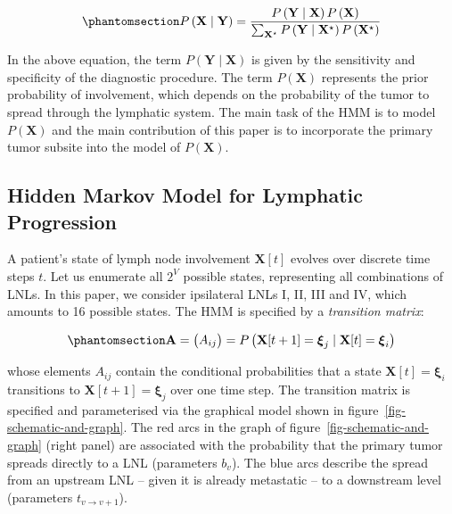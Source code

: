 \documentclass[11pt,twocolumn,twoside]{article}
\begin{document}
\begin{equation}\phantomsection\label{eq-bayes-law}{
P \left( \mathbf{X} \mid \mathbf{Y} \right) = \frac{P \left( \mathbf{Y} \mid \mathbf{X} \right) P \left( \mathbf{X} \right)}{\sum_{\mathbf{X}^\star} P \left( \mathbf{Y} \mid \mathbf{X}^\star \right) P \left( \mathbf{X}^\star \right)}
}\end{equation}

In the above equation, the term
\(P \left( \mathbf{Y} \mid \mathbf{X} \right)\) is given by the
sensitivity and specificity of the diagnostic procedure. The term
\(P \left( \mathbf{X} \right)\) represents the prior probability of
involvement, which depends on the probability of the tumor to spread
through the lymphatic system. The main task of the HMM is to model
\(P \left( \mathbf{X} \right)\) and the main contribution of this paper
is to incorporate the primary tumor subsite into the model of
\(P \left( \mathbf{X} \right)\).

\subsection{Hidden Markov Model for Lymphatic
Progression}\label{sec-hmm}

A patient's state of lymph node involvement \(\mathbf{X}[t]\) evolves
over discrete time steps \(t\). Let us enumerate all \(2^V\) possible
states, representing all combinations of LNLs. In this paper, we
consider ipsilateral LNLs I, II, III and IV, which amounts to 16
possible states. The HMM is specified by a \emph{transition matrix}:

\begin{equation}\phantomsection\label{eq-transition-matrix}{
\mathbf{A} = \begin{pmatrix} A_{ij} \end{pmatrix} = P \left( \mathbf{X}[t+1] = \boldsymbol{\xi}_j \mid \mathbf{X}[t] = \boldsymbol{\xi}_i \right)
}\end{equation}

whose elements \(A_{ij}\) contain the conditional probabilities that a
state \(\mathbf{X}[t]=\boldsymbol{\xi}_i\) transitions to
\(\mathbf{X}[t+1]=\boldsymbol{\xi}_j\) over one time step. The
transition matrix is specified and parameterised via the graphical model
shown in figure~\ref{fig-schematic-and-graph}. The red arcs in the graph
of figure~\ref{fig-schematic-and-graph} (right panel) are associated
with the probability that the primary tumor spreads directly to a LNL
(parameters \(b_v\)). The blue arcs describe the spread from an upstream
LNL -- given it is already metastatic -- to a downstream level
(parameters \(t_{v \rightarrow v+1}\)).
\end{document}
